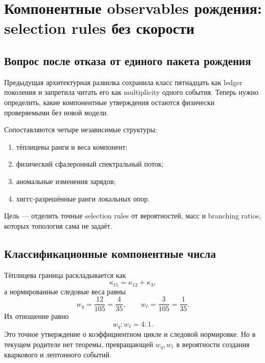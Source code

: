 \chapter{Компонентные observables рождения: selection rules без скорости}
\label{ch:v6-spectral-transition-componentwise-creation-observable-gate}

\section{Вопрос после отказа от единого пакета рождения}

Предыдущая архитектурная развилка сохранила класс пятнадцать как ledger
поколения и запретила читать его как multiplicity одного события. Теперь
нужно определить, какие компонентные утверждения остаются физически
проверяемыми без новой модели.

Сопоставляются четыре независимые структуры:
\begin{enumerate}
 \item тёплицевы ранги и веса компонент;
 \item физический сфалеронный спектральный поток;
 \item аномальные изменения зарядов;
 \item хиггс-разрешённые ранги локальных опор.
\end{enumerate}
Цель --- отделить точные selection rules от вероятностей, масс и
branching ratios, которых топология сама не задаёт.

\section{Классификационные компонентные числа}

Тёплицева граница раскладывается как
\begin{equation}
 \kappa_{15}=\kappa_{12}+\kappa_3,
\end{equation}
а нормированные следовые веса равны
\begin{equation}
 w_q=\frac{12}{105}=\frac4{35},
 \qquad
 w_\ell=\frac3{105}=\frac1{35}.
 \label{eq:v6-component-observable-toeplitz-weights}
\end{equation}
Их отношение равно
\begin{equation}
 w_q:w_\ell=4:1.
\end{equation}
Это точное утверждение о коэффициентном цикле и следовой нормировке. Но
в текущем родителе нет теоремы, превращающей $w_q,w_\ell$ в вероятности
создания кваркового и лептонного событий.

